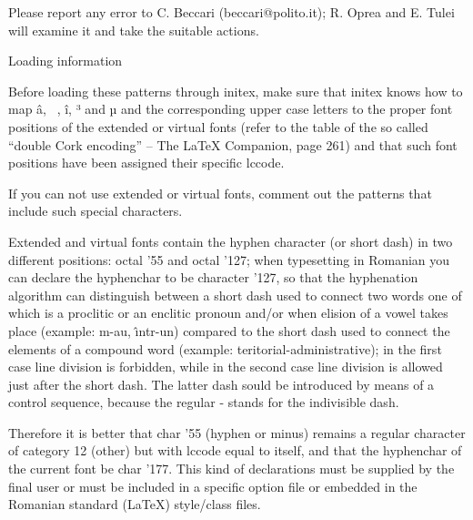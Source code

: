 Please report any error to C. Beccari (beccari@polito.it); R. Oprea and E.
Tulei will examine it and take the suitable actions.


Loading information

Before loading these patterns through  initex, make sure that initex knows
how to map ^^e2, ^^a0, ^^ee, ^^b3 and ^^b5 and  the  corresponding  upper
case letters to the proper font positions of the extended or virtual fonts
(refer to the table of the so called ``double Cork encoding'' -- The LaTeX
Companion, page 261) and that such font positions have been assigned their
specific lccode.

If  you  can  not  use extended or virtual fonts, comment out the patterns
that include such special characters.

Extended and virtual fonts contain the hyphen character (or short dash) in
two different positions:  octal  '55  and  octal '127; when typesetting in
Romanian you can declare the hyphenchar to be character '127, so that  the
hyphenation algorithm can distinguish between a short dash used to connect
two words one of which is a proclitic or an enclitic pronoun  and/or  when
elision  of a vowel takes place (example:  m-au, \^{\i}ntr-un) compared to
the short dash used to connect  the  elements of a compound word (example:
teritorial-administrative); in the first case line division is  forbidden,
while in the second case  line  division  is  allowed just after the short
dash.  The latter dash sould be introduced by means of a control sequence,
because the regular - stands for the indivisible dash.

Therefore it is better that char  '55  (hyphen or minus) remains a regular
character of category 12 (other) but with lccode equal to itself, and that
the  hyphenchar  of  the  current  font  be  char  '177.   This  kind   of
declarations  must  be supplied by the final user or must be included in a
specific  option  file  or  embedded  in  the  Romanian  standard  (LaTeX)
style/class files.

